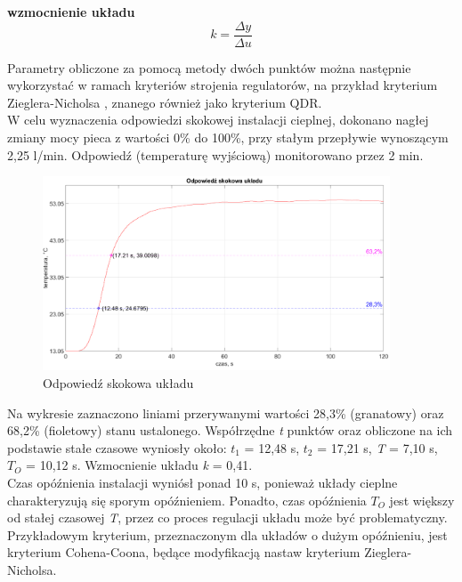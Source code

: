 \documentclass[a4paper,twoside,12pt]{book}
\begin{document}
\textbf{wzmocnienie układu}
\begin{equation}
	k = \frac{\Delta y}{\Delta u}
\end{equation}

\noindent Parametry obliczone za pomocą metody dwóch punktów można następnie wykorzystać w ramach kryteriów strojenia regulatorów, na przykład kryterium Zieglera-Nicholsa \cite{ziegler1942optimum}, znanego również jako kryterium QDR.\\

\noindent W celu wyznaczenia odpowiedzi skokowej instalacji cieplnej, dokonano nagłej zmiany mocy pieca z wartości 0\% do 100\%, przy stałym przepływie wynoszącym 2,25 l/min. Odpowiedź (temperaturę wyjściową) monitorowano przez 2 min.

\begin{figure}[h]
	\centering
	\includegraphics[width=0.92\textwidth]{./wykresy/png/stepResponse.png}
	\caption{Odpowiedź skokowa układu}
	\label{fig:Odpowiedź skokowa}
\end{figure}

\newpage
\noindent Na wykresie zaznaczono liniami przerywanymi wartości 28,3\% (granatowy) oraz 68,2\% (fioletowy) stanu ustalonego. Współrzędne \textit{t} punktów oraz obliczone na ich podstawie stałe czasowe wyniosły około:
\textit{$t_1$} = 12,48 s, \textit{$t_2$} = 17,21 s, \textit{T} = 7,10 s, \textit{$T_O$} = 10,12 s. Wzmocnienie układu \textit{k} = 0,41.\\

Czas opóźnienia instalacji wyniósł ponad 10 s, ponieważ układy cieplne charakteryzują się sporym opóźnieniem. Ponadto, czas opóźnienia $T_O$ jest większy od stałej czasowej \textit{T}, przez co proces regulacji układu może być problematyczny. Przykładowym kryterium, przeznaczonym dla układów o dużym opóźnieniu, jest kryterium Cohena-Coona, będące modyfikacją nastaw kryterium Zieglera-Nicholsa.
\end{document}
